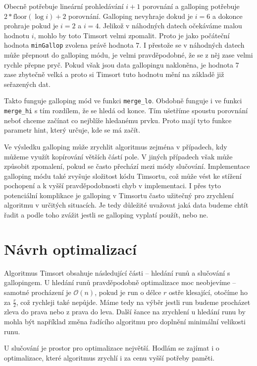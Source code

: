 \documentclass[thesis=B,czech]{FITthesis}[2019/12/23]
\begin{document}
Obecně potřebuje lineární prohledávání $i + 1$ porovnání a galloping potřebuje $2*\textrm{floor}(\log{i})+2$ porovnání. Galloping nevyhraje dokud je $i=6$ a dokonce prohraje pokud je $i=2$ a $i=4$. Jelikož v náhodných datech očekáváme malou hodnotu $ i $, mohlo by toto Timsort velmi zpomalit. Proto je jako počáteční hodnota \texttt{minGallop} zvolena právě hodnota 7. I přestože se v náhodných datech může přepnout do galloping módu, je velmi pravděpodobné, že se z něj zase velmi rychle přepne pryč. Pokud však jsou data gallopingu nakloněna, je hodnota 7 zase zbytečně velká a proto si Timsort tuto hodnotu mění na základě již seřazených dat.


Takto funguje galloping mód ve funkci \texttt{merge\_lo}. Obdobně funguje i ve funkci \texttt{merge\_hi} s tím rozdílem, že se hledá od konce. Tím ušetříme spoustu porovnání neboť chceme začínat co nejblíže hledanému prvku. Proto mají tyto funkce parametr hint, který určuje, kde se má začít.


Ve výsledku galloping může zrychlit algoritmus zejména v případech, kdy můžeme využít kopírování větších částí pole. V jiných případech však může způsobit zpomalení, pokud se často přechází mezi módy slučování. Implementace galloping módu také zvyšuje složitost kódu Timsortu, což může vést ke stížení pochopení a k vyšší pravděpodobnosti chyb v implementaci. I přes tyto potenciální komplikace je galloping v Timsortu často užitečný pro zrychlení algoritmu v určitých situacích. Je tedy důležité uvažovat jaká data budeme chtít řadit a podle toho zvážit jestli se galloping vyplatí použít, nebo ne.

\section{Návrh optimalizací}

Algoritmus Timsort obsahuje následující části -- hledání runů a slučování s gallopingem. U hledání runů pravděpodobně optimalizace moc neobjevíme -- samotné procházení je $ \mathcal{O}(n) $, pokud je run o délce $ r $ ostře klesající, otočíme ho za $ \frac{r}{2} $, což rychleji také nepůjde. Máme tedy na výběr jestli run budeme procházet zleva do prava nebo z prava do leva. Další šance na zrychlení u hledání runu by mohla být například změna řadícího algoritmu pro doplnění minimální velikosti runu. 

U slučování je prostor pro optimalizace největší. Hodlám se zajímat i o optimalizace, které algoritmus zrychlí i za cenu vyšší potřeby paměti.
\end{document}
